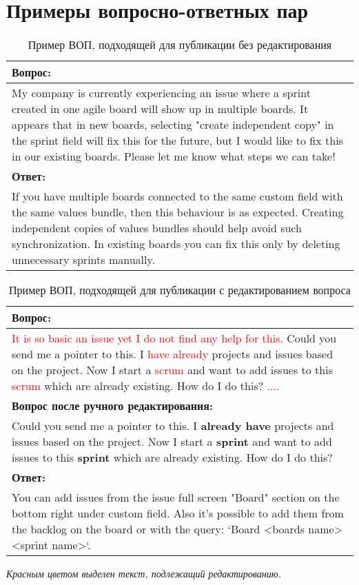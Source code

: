 \chapter{Примеры вопросно-ответных пар}
\label{appx03}

\begin{table}[tph!]
\caption{Пример ВОП, подходящей для публикации без редактирования}
\label{vop_ok}
\centering
\begin{tabular}{|L{11cm}|}
\hline
\textbf{Вопрос:}\\
\hline
My company is currently experiencing an issue where a sprint created in one agile board will show up in multiple boards. It appears that in new boards, selecting "create independent copy" in the sprint field will fix this for the future, but I would like to fix this in our existing boards. Please let me know what steps we can take!\\
\hline
\textbf{Ответ:}\\
\hline
If you have multiple boards connected to the same custom field with the same values bundle, then this behaviour is as expected. Creating independent copies of values bundles should help avoid such synchronization. In existing boards you can fix this only by deleting unnecessary sprints manually.\\
\hline
\end{tabular}
\end{table}

\begin{table}[tph!]
\caption{Пример ВОП, подходящей для публикации с редактированием вопроса}
\label{vop_ok}
\centering
\begin{tabular}{|L{11cm}|}
\hline
\textbf{Вопрос:}\\
\hline
\textcolor{red}{It is so basic an issue yet I do not find any help for this.} Could you send me a pointer to this. I \textcolor{red}{have already} projects and issues based on the project. Now I start a \textcolor{red}{scrum} and want to add issues to this \textcolor{red}{scrum} which are already existing. How do I do this? \textcolor{red}{....}\\
\hline
\textbf{Вопрос после ручного редактирования:}\\
\hline
Could you send me a pointer to this. I \textbf{already have} projects and issues based on the project. Now I start a \textbf{sprint} and want to add issues to this \textbf{sprint} which are already existing. How do I do this?\\
\hline
\textbf{Ответ:}\\
\hline
You can add issues from the issue full screen "Board" section on the bottom right under custom field. Also it's possible to add them from the backlog on the board or with the query: `Board <boards name> <sprint name>`.
\\
\hline
\end{tabular}
\vspace{1mm}

     \raggedright \textit{Красным цветом выделен текст, подлежащий редактированию.}
\end{table}

